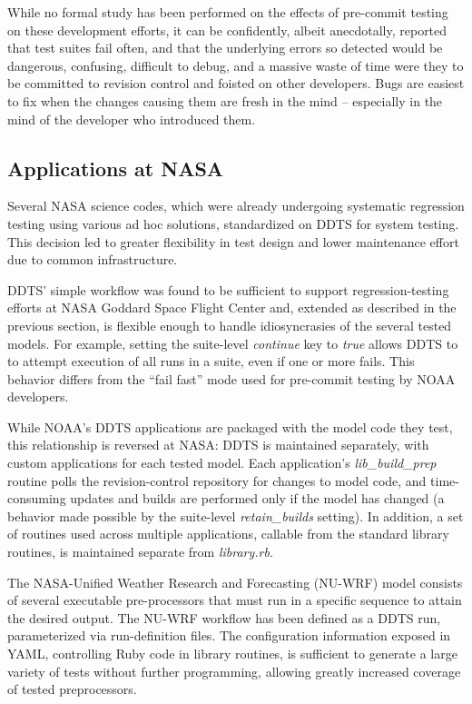 \documentclass[conference]{IEEEtran}
\begin{document}
While no formal study has been performed on the effects of pre-commit testing on these development efforts, it can be confidently, albeit anecdotally, reported that test suites fail often, and that the underlying errors so detected would be dangerous, confusing, difficult to debug, and a massive waste of time were they to be committed to revision control and foisted on other developers. Bugs are easiest to fix when the changes causing them are fresh in the mind -- especially in the mind of the developer who introduced them.

\subsection{Applications at NASA}

Several NASA science codes, which were already undergoing systematic regression testing using various ad hoc solutions, standardized on DDTS for system testing. This decision led to greater flexibility in test design and lower maintenance effort due to common infrastructure.

DDTS' simple workflow was found to be sufficient to support regression-testing efforts at NASA Goddard Space Flight Center and, extended as described in the previous section, is flexible enough to handle idiosyncrasies of the several tested models. For example, setting the suite-level \emph{continue} key to \emph{true} allows DDTS to to attempt execution of all runs in a suite, even if one or more fails. This behavior differs from the ``fail fast'' mode used for pre-commit testing by NOAA developers.

While NOAA's DDTS applications are packaged with the model code they test, this relationship is reversed at NASA: DDTS is maintained separately, with custom applications for each tested model. Each application's \emph{lib\_build\_prep} routine polls the revision-control repository for changes to model code, and time-consuming updates and builds are performed only if the model has changed (a behavior made possible by the suite-level \emph{retain\_builds} setting). In addition, a set of routines used across multiple applications, callable from the standard library routines, is maintained separate from \emph{library.rb}.

The NASA-Unified Weather Research and Forecasting (NU-WRF) \cite{nuwrf} model consists of several executable pre-processors that must run in a specific sequence to attain the desired output. The NU-WRF workflow has been defined as a DDTS run, parameterized via run-definition files. The configuration information exposed in YAML, controlling Ruby code in library routines, is sufficient to generate a large variety of tests without further programming, allowing greatly increased coverage of tested preprocessors.
\end{document}
